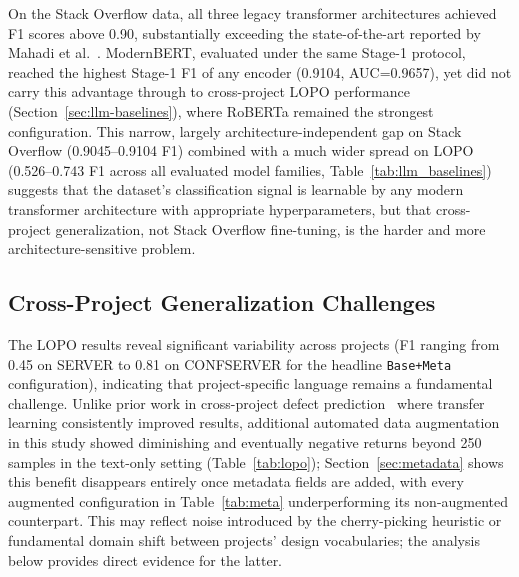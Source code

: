 \documentclass[preprint,12pt]{elsarticle}
\begin{document}
On the Stack Overflow data, all three legacy transformer architectures achieved F1 scores above 0.90, substantially exceeding the state-of-the-art reported by Mahadi et al.~\cite{mahadi2021}. ModernBERT, evaluated under the same Stage-1 protocol, reached the highest Stage-1 F1 of any encoder (0.9104, AUC=0.9657), yet did not carry this advantage through to cross-project LOPO performance (Section~\ref{sec:llm-baselines}), where RoBERTa remained the strongest configuration. This narrow, largely architecture-independent gap on Stack Overflow (0.9045--0.9104 F1) combined with a much wider spread on LOPO (0.526--0.743 F1 across all evaluated model families, Table~\ref{tab:llm_baselines}) suggests that the dataset's classification signal is learnable by any modern transformer architecture with appropriate hyperparameters, but that cross-project generalization, not Stack Overflow fine-tuning, is the harder and more architecture-sensitive problem.

\subsection{Cross-Project Generalization Challenges}
\label{sec:cross-project}

The LOPO results reveal significant variability across projects (F1 ranging from 0.45 on SERVER to 0.81 on CONFSERVER for the headline \texttt{Base+Meta} configuration), indicating that project-specific language remains a fundamental challenge. Unlike prior work in cross-project defect prediction~\cite{nam2013, dam2021} where transfer learning consistently improved results, additional automated data augmentation in this study showed diminishing and eventually negative returns beyond 250 samples in the text-only setting (Table~\ref{tab:lopo}); Section~\ref{sec:metadata} shows this benefit disappears entirely once metadata fields are added, with every augmented configuration in Table~\ref{tab:meta} underperforming its non-augmented counterpart. This may reflect noise introduced by the cherry-picking heuristic or fundamental domain shift between projects' design vocabularies; the analysis below provides direct evidence for the latter.
\end{document}
